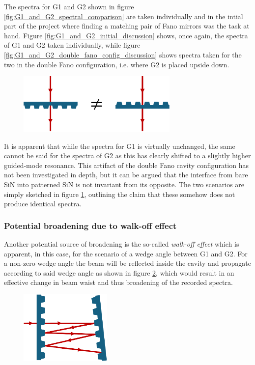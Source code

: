 The spectra for G1 and G2 shown in figure \ref{fig:G1_and_G2_spectral_comparison} are taken individually and in the intial part of the project where finding a matching pair of Fano mirrors was the task at hand. Figure \ref{fig:G1_and_G2_initial_discussion} shows, once again, the spectra of G1 and G2 taken individually, while figure \ref{fig:G1_and_G2_double_fano_config_discussion} shows spectra taken for the two in the double Fano configuration, i.e. where G2 is placed upside down. 

\begin{figure}[h!]
    \centering
    \includegraphics[width=0.7\textwidth]{figures/upside_down_membrane_sketch.pdf}
    \caption{}
    \label{fig:upside_down_membrane_sketch}
\end{figure}

It is apparent that while the spectra for G1 is virtually unchanged, the same cannot be said for the spectra of G2 as this has clearly shifted to a slightly higher guided-mode resonance. This artifact of the double Fano cavity configuration has not been investigated in depth, but it can be argued that the interface from bare SiN into patterned SiN is not invariant from its opposite. The two scenarios are simply sketched in figure \ref{fig:upside_down_membrane_sketch}, outlining the claim that these somehow does not produce identical spectra.

\subsubsection{Potential broadening due to walk-off effect}

Another potential source of broadening is the so-called \emph{walk-off effect} which is apparent, in this case, for the scenario of a wedge angle between G1 and G2. For a non-zero wedge angle the beam will be reflected inside the cavity and propagate according to said wedge angle as shown in figure \ref{fig:walk_off_sketch}, which would result in an effective change in beam waist and thus broadening of the recorded spectra.

\begin{figure}[h!]
    \centering
    \includegraphics[width=0.4\textwidth]{figures/walk_off_sketch.pdf}
    \caption{}
    \label{fig:walk_off_sketch}
\end{figure}

